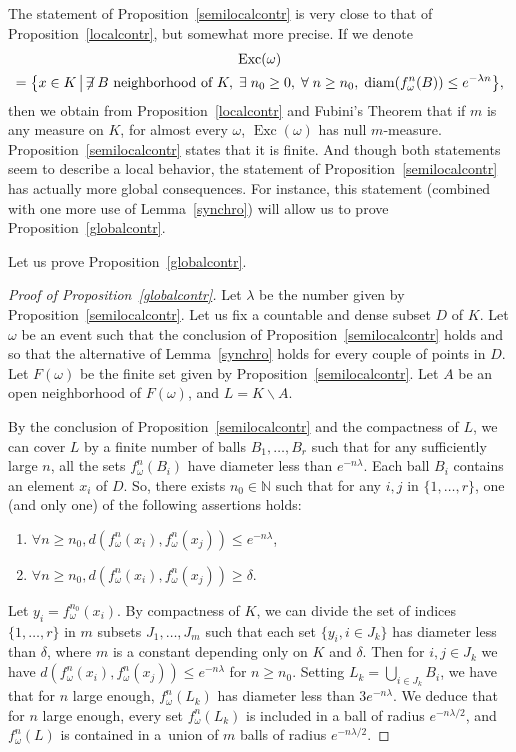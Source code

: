 \documentclass[AHL,Unicode,longabstracts,published]{cedram}
\DeclareMathOperator{\Exc}{Exc}
\DeclareMathOperator{\diam}{diam}
\newcommand{\N}{\mathbb{N}}
\let\originalleft\left
\let\originalright\right
\renewcommand{\left}{\mathopen{}\mathclose\bgroup\originalleft}
\renewcommand{\right}{\aftergroup\egroup\originalright}
\let\oldexists\exists
\renewcommand*{\exists}{\mathrel{\oldexists}}
\let\oldforall\forall
\renewcommand*{\forall}{\mathrel{\oldforall}}
\begin{document}
\begin{rema}
The statement of Proposition~\ref{semilocalcontr} is very close to that of Proposition~\ref{localcontr}, but somewhat more precise. If we denote
\begin{multline}
\Exc(\omega)\\
=\left\{x\in K\,\middle|\,\not\exists B \text{ neighborhood of } K, \;\exists n_0 \geq 0,\;\forall n\geq n_0,\; \diam(f_\omega^n(B)) \leq e^{-\lambda n}\right\},
\end{multline}
then we obtain from Proposition~\ref{localcontr} and Fubini's Theorem that if $m$ is any measure on $K$, for almost every $\omega$, $\Exc(\omega)$ has null $m$-measure. Proposition~\ref{semilocalcontr} states that it is finite. And though both statements seem to describe a local behavior, the statement of Proposition~\ref{semilocalcontr} has actually more global consequences. For instance, this statement (combined with one more use of Lemma~\ref{synchro}) will allow us to prove Proposition~\ref{globalcontr}.
\end{rema}


Let us prove Proposition~\ref{globalcontr}.

\begin{proof}[Proof of Proposition~\ref{globalcontr}]
Let $\lambda$ be the number given by Proposition~\ref{semilocalcontr}. Let us fix a countable and dense subset $D$ of $K$. Let $\omega$ be an event such that the conclusion of Proposition~\ref{semilocalcontr} holds and so that the alternative of Lemma~\ref{synchro} holds for every couple of points in $D$. Let $F(\omega)$ be the finite set given by Proposition~\ref{semilocalcontr}. Let $A$ be an open neighborhood of $F(\omega)$, and $L=K\backslash A$.

By the conclusion of Proposition~\ref{semilocalcontr} and the compactness of $L$, we can cover $L$ by a finite number of balls $B_1,\dots,B_r$ such that for any sufficiently large $n$, all the sets $f_\omega^n(B_i)$ have diameter less than $e^{-n\lambda}$. Each ball $B_i$ contains an element $x_i$ of $D$. So, there exists $n_0\in\N$ such that for any $i,j$ in $\{1,\dots,r\}$, one (and only one) of the following assertions holds:
\begin{enumerate}
\item $\forall n\geq n_0, d(f_\omega^n(x_i),f_\omega^n(x_j))\leq e^{-n\lambda}$,
\item $\forall n\geq n_0, d(f_\omega^n(x_i),f_\omega^n(x_j))\geq \delta$.
\end{enumerate}
Let $y_i=f_\omega^{n_0}(x_i)$. By compactness of $K$, we can divide the set of indices $\{1,\dots,r\}$ in $m$ subsets $J_1,\dots,J_m$ such that each set $\{y_i,i\in J_k\}$ has diameter less than $\delta$, where $m$ is a constant depending only on $K$ and $\delta$. Then for $i,j\in J_k$ we have $d(f_\omega^n(x_i),f_\omega^n(x_j))\leq e^{-n\lambda}$ for $n\geq n_0$. Setting $L_k=\bigcup_{i\in J_k} B_i$, we have that for $n$ large enough, $f_\omega^n(L_k)$ has diameter less than $3e^{-n\lambda}$. We deduce that for $n$ large enough, every set $f_\omega^n(L_k)$ is included in a ball of radius $e^{-n\lambda/2}$, and $f_\omega^n(L)$ is contained in a~union of $m$ balls of radius $e^{-n\lambda/2}$.
\end{proof}
\end{document}
